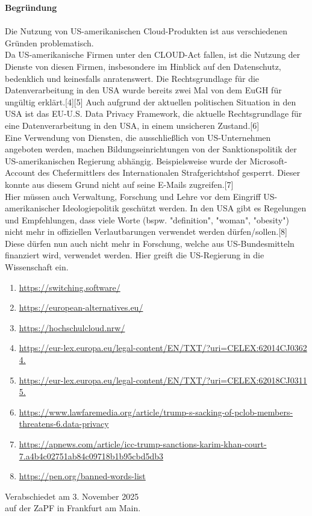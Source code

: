 \documentclass[DIV=calc]{scrartcl}
\let\oldgrqq=\grqq
\def\grqq{\oldgrqq\xspace}
\begin{document}
 \textbf{Begründung}\\ \\
 Die Nutzung von US-amerikanischen Cloud-Produkten ist aus verschiedenen Gründen problematisch.\\
Da US-amerikanische Firmen unter den CLOUD-Act fallen, ist die Nutzung der Dienste von diesen Firmen, insbesondere im Hinblick auf den Datenschutz, bedenklich und keinesfalls anratenswert. Die Rechtsgrundlage für die Datenverarbeitung in den USA wurde bereits zwei Mal von dem EuGH für ungültig erklärt.[4][5] Auch aufgrund der aktuellen politischen Situation in den USA ist das EU-U.S. Data Privacy Framework, die aktuelle Rechtsgrundlage für eine Datenverarbeitung in den USA, in einem
 unsicheren Zustand.[6]\\
 Eine Verwendung von Diensten, die ausschließlich von US-Unternehmen angeboten werden,
 machen Bildungseinrichtungen von der Sanktionspolitik der US-amerikanischen Regierung
 abhängig. Beispielsweise wurde der Microsoft-Account des Chefermittlers des Internationalen Strafgerichtshof gesperrt. Dieser konnte aus diesem Grund nicht auf seine E-Mails zugreifen.[7]\\
 Hier müssen auch Verwaltung, Forschung und Lehre vor dem Eingriff US-amerikanischer Ideologiepolitik geschützt werden. In den USA gibt es Regelungen und Empfehlungen, dass viele Worte (bspw. "definition", "woman", "obesity") nicht mehr in offiziellen Verlautbarungen verwendet werden dürfen/sollen.[8] Diese dürfen nun auch nicht mehr in Forschung, welche aus US-Bundesmitteln finanziert wird, verwendet werden. Hier greift die US-Regierung in die Wissenschaft ein.\\
 \begin{enumerate}
     \item \url{https://switching.software/} 
\item \url{https://european-alternatives.eu/}
\item \url{https://hochschulcloud.nrw/} 
\item \url{https://eur-lex.europa.eu/legal-content/EN/TXT/?uri=CELEX:62014CJ0362 4.} 
\item \url{https://eur-lex.europa.eu/legal-content/EN/TXT/?uri=CELEX:62018CJ0311 5.} 
\item \url{https://www.lawfaremedia.org/article/trump-s-sacking-of-pclob-members-threatens-6.data-privacy}
\item \url{https://apnews.com/article/icc-trump-sanctions-karim-khan-court-7.a4b4c02751ab84c09718b1b95cbd5db3}
\item \url{https://pen.org/banned-words-list}\grqq
\end{enumerate}
%
%
\vfill
\begin{flushright}
	Verabschiedet am 3. November 2025 \\
	auf der ZaPF in Frankfurt am Main.
\end{flushright}
\end{document}

